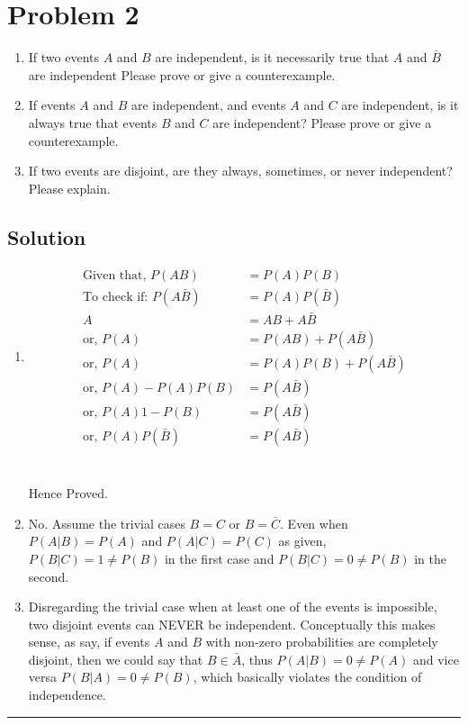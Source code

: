 \section{Problem 2}

\begin{enumerate}[2a.]
	\item If two events $A$ and $B$ are independent, is it necessarily true that $A$ and $\bar{B}$ are independent Please prove or give a counterexample.
	\item If events $A$ and $B$ are independent, and events $A$ and $C$ are independent, is it always true that events $B$ and $C$ are independent? Please prove or give a counterexample.
	\item If two events are disjoint, are they always, sometimes, or never independent? Please explain.
\end{enumerate}

\subsection{Solution}
\begin{enumerate}[2a.]
	\item
	\begin{align}
		\text{Given that, } P(AB) &= P(A)P(B) \label{eq:given1} \\
		\text{To check if: } P(A\bar{B}) &= P(A)P(\bar{B}) \label{eq:toCheck1} \\
		A &= AB + A\bar{B} \label{eq:LOTPAB}\\
		\text{or, } P(A) &= P(AB) + P(A\bar{B}) \nonumber\\
		\text{or, } P(A) &= P(A)P(B) + P(A\bar{B}) \nonumber\\
		\text{or, } P(A) - P(A)P(B) &= P(A\bar{B}) \nonumber\\
		\text{or, } P(A){1-P(B)} &= P(A\bar{B}) \nonumber\\
		\text{or, } P(A)P(\bar{B}) &= P(A\bar{B}) \nonumber
	\end{align}
	 \\
	\\
	Hence Proved.\Laughey
	
	\item No. Assume the trivial cases $B = C$ or $B = \bar{C}$. Even when $P(A|B) = P(A)$ and $P(A|C) = P(C)$ as given, $P(B|C) = 1 \neq P(B)$ in the first case and $P(B|C) = 0 \neq P(B)$ in the second.
	
	\item Disregarding the trivial case when at least one of the events is impossible, two disjoint events can NEVER be independent. Conceptually this makes sense, as say, if events $A$ and $B$ with non-zero probabilities are completely disjoint, then we could say that $B \in \bar{A}$, thus $P(A|B) = 0 \neq P(A)$ and vice versa $P(B|A) = 0 \neq P(B)$, which basically violates the condition of independence.
\end{enumerate} 
\noindent\rule{\textwidth}{1pt}